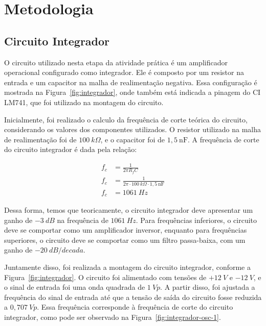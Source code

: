 \section{Metodologia}

\subsection{Circuito Integrador}

O circuito utilizado nesta etapa da atividade prática é um amplificador operacional configurado como integrador. Ele é composto por um resistor na entrada e um capacitor na malha de realimentação negativa. Essa configuração é mostrada na Figura~\ref{fig:integrador}, onde também está indicada a pinagem do CI LM741, que foi utilizado na montagem do circuito.


Inicialmente, foi realizado o calculo da frequência de corte teórica do circuito, considerando os valores dos componentes utilizados. O resistor utilizado na malha de realimentação foi de $100~k\Omega$, e o capacitor foi de $1,5~\si{\nano\farad}$. A frequência de corte do circuito integrador é dada pela relação:

\begin{align}
    f_c &= \frac{1}{2 \pi R_f C} \\
    f_c &= \frac{1}{2 \pi \cdot 100~k\Omega \cdot 1,5~\si{\nano\farad}} \\
    f_c &= 1061~Hz
\end{align}

Dessa forma, temos que teoricamente, o circuito integrador deve apresentar um ganho de $-3~dB$ na frequência de $1061~Hz$. Para frequências inferiores, o circuito deve se comportar como um amplificador inversor, enquanto para frequências superiores, o circuito deve se comportar como um filtro passa-baixa, com um ganho de $-20~dB/decada$.

Juntamente disso, foi realizada a montagem do circuito integrador, conforme a Figura~\ref{fig:integrador}. O circuito foi alimentado com tensões de $+12~V$ e $-12~V$, e o sinal de entrada foi uma onda quadrada de $1~Vp$. A partir disso, foi ajustada a frequência do sinal de entrada até que a tensão de saída do circuito fosse reduzida a $0,707~Vp$. Essa frequência corresponde à frequência de corte do circuito integrador, como pode ser observado na Figura~\ref{fig:integrador-osc-1}.

